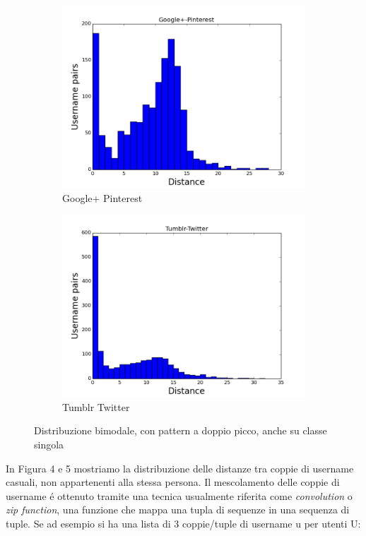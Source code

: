 \begin{figure}
\begin{subfigure}{.5\textwidth}
  \centering
  \includegraphics[width=.8\linewidth]{chapters/distanceplot/Google+-Pinterest.png}
  \caption{Google+ Pinterest}
  \label{fig:sfig1}
\end{subfigure}%
\begin{subfigure}{.5\textwidth}
  \centering
  \includegraphics[width=.8\linewidth]{chapters/distanceplot/Tumblr-Twitter.png}
  \caption{Tumblr Twitter}
  \label{fig:sfig2}
\end{subfigure}
\caption{Distribuzione bimodale, con pattern a doppio picco, anche su classe singola}
\label{fig:fig}
\end{figure}

In Figura 4 e 5 mostriamo la distribuzione delle distanze tra coppie di username casuali, non appartenenti alla stessa persona. Il mescolamento delle coppie di username é ottenuto tramite una tecnica usualmente riferita come \textit{convolution} o \textit{zip function}, una funzione che mappa una tupla di sequenze in una sequenza di tuple. Se ad esempio si ha una lista di 3 coppie/tuple di username u per utenti U:

